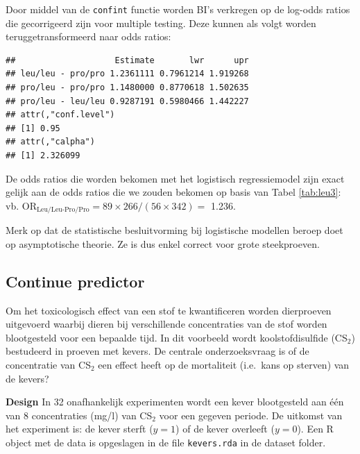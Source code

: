 \documentclass[
  12pt,dutch]{book}
\newenvironment{Shaded}{\begin{snugshade}}{\end{snugshade}}
\newcommand{\FunctionTok}[1]{\textcolor[rgb]{0.13,0.29,0.53}{\textbf{#1}}}
\newcommand{\NormalTok}[1]{#1}
\newcommand{\OtherTok}[1]{\textcolor[rgb]{0.56,0.35,0.01}{#1}}
\newcommand{\SpecialCharTok}[1]{\textcolor[rgb]{0.81,0.36,0.00}{\textbf{#1}}}
\theoremstyle{definition}
\theoremstyle{definition}
\theoremstyle{definition}
\theoremstyle{definition}
\theoremstyle{remark}
\begin{document}
Door middel van de \texttt{confint} functie worden BI's verkregen op de log-odds ratios die gecorrigeerd zijn voor multiple testing. Deze kunnen als volgt worden teruggetransformeerd naar odds ratios:

\begin{Shaded}
\end{Shaded}

\begin{verbatim}
##                    Estimate       lwr      upr
## leu/leu - pro/pro 1.2361111 0.7961214 1.919268
## pro/leu - pro/pro 1.1480000 0.8770618 1.502635
## pro/leu - leu/leu 0.9287191 0.5980466 1.442227
## attr(,"conf.level")
## [1] 0.95
## attr(,"calpha")
## [1] 2.326099
\end{verbatim}

De odds ratios die worden bekomen met het logistisch regressiemodel zijn exact gelijk aan de odds ratios die we zouden bekomen op basis van Tabel \ref{tab:leu3}:
vb. \(\text{OR}_\text{Leu/Leu-Pro/Pro}=89\times 266/(56\times 342)=\) 1.236.

Merk op dat de statistische besluitvorming bij logistische modellen beroep doet op asymptotische theorie. Ze is dus enkel correct voor grote steekproeven.

\subsection{Continue predictor}\label{continue-predictor}

Om het toxicologisch effect van een stof te kwantificeren worden dierproeven uitgevoerd waarbij dieren bij verschillende concentraties van de stof worden blootgesteld voor een bepaalde tijd. In dit voorbeeld wordt koolstofdisulfide (CS\(_2\)) bestudeerd in proeven met kevers.
De centrale onderzoeksvraag is of de concentratie van CS\(_2\) een effect heeft op de mortaliteit (i.e.~kans op sterven) van de kevers?

\textbf{Design} In 32 onafhankelijk experimenten wordt een kever blootgesteld aan één van 8 concentraties (mg/l) van CS\(_2\) voor een gegeven periode. De uitkomst van het experiment is: de kever sterft (\(y=1\)) of de kever overleeft (\(y=0\)).
Een R object met de data is opgeslagen in de file \texttt{kevers.rda} in de dataset folder.
\end{document}
